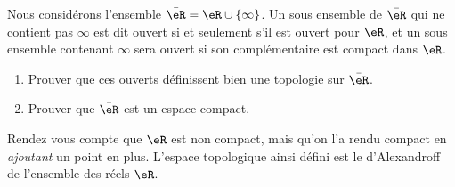 
\begin{exercice}\label{exo0088}

Nous considérons l'ensemble $\bar\eR=\eR\cup\{\infty\}$. Un sous ensemble de $\bar\eR$ qui ne contient pas $\infty$ est dit ouvert si et seulement s'il est ouvert pour $\eR$, et un sous ensemble contenant $\infty$ sera ouvert si son complémentaire est compact dans $\eR$.

\begin{enumerate}

\item
Prouver que ces ouverts définissent bien une topologie sur $\bar\eR$.

\item
Prouver que $\bar\eR$ est un espace compact.

\end{enumerate}
Rendez vous compte que $\eR$ est non compact, mais qu'on l'a rendu compact en \emph{ajoutant} un point en plus. L'espace topologique ainsi défini est le  d'Alexandroff de l'ensemble des réels $\eR$.

\end{exercice}
